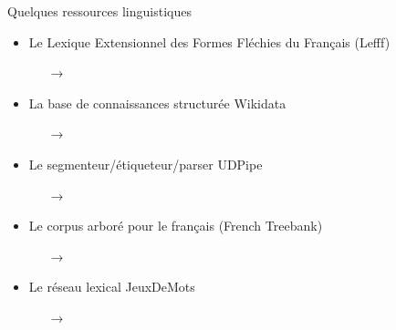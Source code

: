 \documentclass[hyperref={unicode}, xcolor={svgnames}, french]{beamer}
\begin{document}
\begin{frame}{Quelques ressources linguistiques}
    \begin{itemize}
        \item Le Lexique Extensionnel des Formes Fléchies du Français (Lefff)
            \begin{itemize}
                \item[→] 
            \end{itemize}
        \item La base de connaissances structurée Wikidata
            \begin{itemize}
                \item[→] 
            \end{itemize}
        \item Le segmenteur/étiqueteur/parser UDPipe
            \begin{itemize}
                \item[→] 
            \end{itemize}
        \item Le corpus arboré pour le français (French Treebank)
            \begin{itemize}
                \item[→] 
            \end{itemize}
        \item Le réseau lexical JeuxDeMots
            \begin{itemize}
                \item[→] 
            \end{itemize}
    \end{itemize}
\end{frame}

\end{document}
